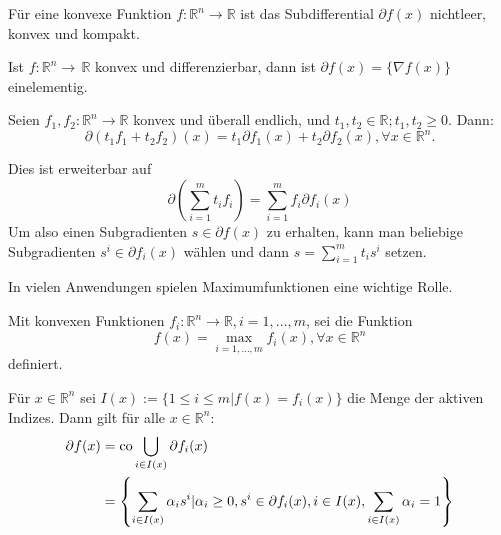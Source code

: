 \begin{Satz}
 Für eine konvexe Funktion $f:\mathbb{R}^n\rightarrow\mathbb{R}$ ist das Subdifferential $\partial f(x)$ nichtleer, 
konvex und kompakt.
\end{Satz}

\begin{Satz}
 Ist $f:\mathbb{R}^n\rightarrow\,\mathbb{R}$ konvex und differenzierbar, dann ist $\partial f(x) = \{\nabla f(x)\}$ 
einelementig.
\end{Satz}

\begin{Satz}
 Seien $f_1,f_2:\mathbb{R}^n\rightarrow\mathbb{R}$ konvex und überall endlich, und $t_1,t_2\in\mathbb{R};t_1,t_2\geq 
0$. Dann:
\begin{equation}
 \partial(t_1f_1+t_2f_2)(x) = t_1\partial f_1(x) + t_2\partial f_2(x), \forall x\in\mathbb{R}^n.
\end{equation}
\end{Satz}

\begin{Bemerkung}
 Dies ist erweiterbar auf 
 \begin{equation}
  \partial(\sum\limits_{i=1}^m t_if_i) = \sum_{i=1}^m f_i\partial f_i(x) 
 \end{equation}
Um also einen Subgradienten $s\in\partial f(x)$ zu erhalten, kann man beliebige Subgradienten $s^i\in\partial f_i(x)$ 
wählen und dann $s=\sum\limits_{i=1}^m t_is^i$ setzen.
\end{Bemerkung}

In vielen Anwendungen spielen Maximumfunktionen eine wichtige Rolle.

\begin{Satz}
 Mit konvexen Funktionen $f_i:\mathbb{R}^n\rightarrow\mathbb{R}, i=1,\dots,m$, sei die Funktion
 \begin{equation}
  f(x) = \max_{i=1,\dots,m} f_i(x), \forall x\in\mathbb{R}^n
 \end{equation}
 definiert.

 Für $x\in\mathbb{R}^n$ sei $I(x):=\{1\leq i\leq m|f(x)= f_i(x)\}$ die Menge der aktiven Indizes.
 Dann gilt für alle $x\in\mathbb{R}^n$:
 \begin{align}
  \partial f(x) & = \operatorname{co}\bigcup_{i\in I(x)}\partial f_i(x) \nonumber \\
  & = \left\{\sum\limits_{i\in I(x)} \alpha_i s^i | \alpha_i 
\geq 0, s^i \in \partial f_i(x), i\in I(x), \sum\limits_{i \in I(x)} \alpha_i = 1\right\}
 \end{align}
\end{Satz}


